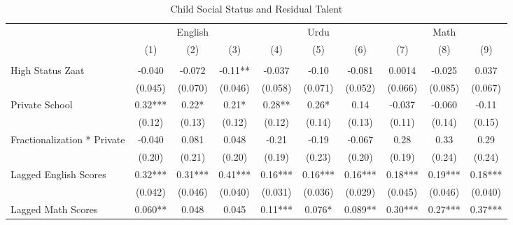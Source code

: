 \begin{sidewaystable}[htbp]\centering
\def\sym#1{\ifmmode^{#1}\else\(^{#1}\)\fi}
\caption{Child Social Status and Residual Talent\label{castesarentdumb}}
\begin{tabular}{l*{9}{c}}
\toprule
                &\multicolumn{3}{c}{English}           &\multicolumn{3}{c}{Urdu}              &\multicolumn{3}{c}{Math}              \\\cmidrule(lr){2-4}\cmidrule(lr){5-7}\cmidrule(lr){8-10}
                &\multicolumn{1}{c}{(1)}&\multicolumn{1}{c}{(2)}&\multicolumn{1}{c}{(3)}&\multicolumn{1}{c}{(4)}&\multicolumn{1}{c}{(5)}&\multicolumn{1}{c}{(6)}&\multicolumn{1}{c}{(7)}&\multicolumn{1}{c}{(8)}&\multicolumn{1}{c}{(9)}\\
                &\multicolumn{1}{c}{}&\multicolumn{1}{c}{}&\multicolumn{1}{c}{}&\multicolumn{1}{c}{}&\multicolumn{1}{c}{}&\multicolumn{1}{c}{}&\multicolumn{1}{c}{}&\multicolumn{1}{c}{}&\multicolumn{1}{c}{}\\
\midrule
High Status Zaat&   -0.040   &   -0.072   &    -0.11** &   -0.037   &    -0.10   &   -0.081   &   0.0014   &   -0.025   &    0.037   \\
                &  (0.045)   &  (0.070)   &  (0.046)   &  (0.058)   &  (0.071)   &  (0.052)   &  (0.066)   &  (0.085)   &  (0.067)   \\
Private School  &     0.32***&     0.22*  &     0.21*  &     0.28** &     0.26*  &     0.14   &   -0.037   &   -0.060   &    -0.11   \\
                &   (0.12)   &   (0.13)   &   (0.12)   &   (0.12)   &   (0.14)   &   (0.13)   &   (0.11)   &   (0.14)   &   (0.15)   \\
Fractionalization * Private&   -0.040   &    0.081   &    0.048   &    -0.21   &    -0.19   &   -0.067   &     0.28   &     0.33   &     0.29   \\
                &   (0.20)   &   (0.21)   &   (0.20)   &   (0.19)   &   (0.23)   &   (0.20)   &   (0.19)   &   (0.24)   &   (0.24)   \\
Lagged English Scores&     0.32***&     0.31***&     0.41***&     0.16***&     0.16***&     0.16***&     0.18***&     0.19***&     0.18***\\
                &  (0.042)   &  (0.046)   &  (0.040)   &  (0.031)   &  (0.036)   &  (0.029)   &  (0.045)   &  (0.046)   &  (0.040)   \\
Lagged Math Scores&    0.060** &    0.048   &    0.045   &     0.11***&    0.076*  &    0.089** &     0.30***&     0.27***&     0.37***\\

\end{tabular}
\end{sidewaystable}
